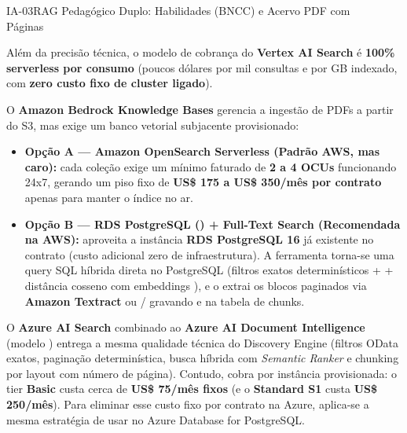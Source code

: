\begin{pecaarq}{IA-03}{RAG Pedagógico Duplo: Habilidades (BNCC) e Acervo PDF com Páginas}{\sgcp~\nativo\enspace\saws~\adaptacao\enspace\sazure~\adaptacao}
\begin{campos}
  Além da precisão técnica, o modelo de cobrança do \textbf{Vertex AI Search} é \textbf{100\% serverless por consumo} (poucos dólares por mil consultas e por GB indexado, com \textbf{zero custo fixo de cluster ligado}).
  \item[Equivalente AWS] O \textbf{Amazon Bedrock Knowledge Bases} gerencia a ingestão de PDFs a partir do S3, mas exige um banco vetorial subjacente provisionado:
  \begin{itemize}
    \item \textbf{Opção A --- Amazon OpenSearch Serverless (Padrão AWS, mas caro):} cada coleção exige um mínimo faturado de \textbf{2 a 4 OCUs} funcionando 24x7, gerando um piso fixo de \textbf{US\$ 175 a US\$ 350/mês por contrato} apenas para manter o índice no ar.
    \item \textbf{Opção B --- RDS PostgreSQL () + Full-Text Search (Recomendada na AWS):} aproveita a instância \textbf{RDS PostgreSQL 16} já existente no contrato (custo adicional zero de infraestrutura). A ferramenta  torna-se uma query SQL híbrida direta no PostgreSQL (filtros exatos determinísticos +  + distância cosseno com embeddings ), e o  extrai os blocos paginados via \textbf{Amazon Textract} ou / gravando  e  na tabela de chunks.
  \end{itemize}
  \item[Equivalente Azure] O \textbf{Azure AI Search} combinado ao \textbf{Azure AI Document Intelligence} (modelo ) entrega a mesma qualidade técnica do Discovery Engine (filtros OData exatos, paginação determinística, busca híbrida com \emph{Semantic Ranker} e chunking por layout com número de página). Contudo, cobra por instância provisionada: o tier \textbf{Basic} custa cerca de \textbf{US\$ 75/mês fixos} (e o \textbf{Standard S1} custa \textbf{US\$ 250/mês}). Para eliminar esse custo fixo por contrato na Azure, aplica-se a mesma estratégia de usar \textbf{} no Azure Database for PostgreSQL.
\end{campos}
\end{pecaarq}

